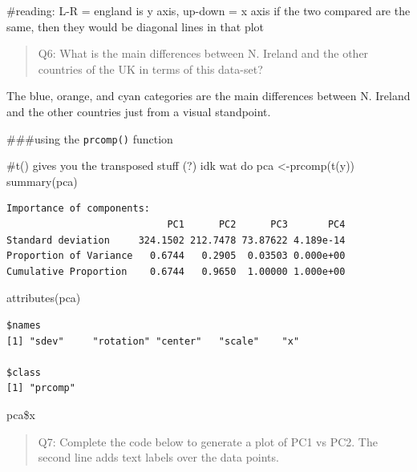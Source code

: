 \documentclass[
  letterpaper,
  DIV=11,
  numbers=noendperiod]{scrartcl}
\newenvironment{Shaded}{\begin{snugshade}}{\end{snugshade}}
\newcommand{\CommentTok}[1]{\textcolor[rgb]{0.37,0.37,0.37}{#1}}
\newcommand{\FunctionTok}[1]{\textcolor[rgb]{0.28,0.35,0.67}{#1}}
\newcommand{\NormalTok}[1]{\textcolor[rgb]{0.00,0.23,0.31}{#1}}
\newcommand{\OtherTok}[1]{\textcolor[rgb]{0.00,0.23,0.31}{#1}}
\begin{document}
\begin{Shaded}
\begin{Highlighting}[]
\CommentTok{\#reading: L{-}R = england is y axis, up{-}down = x axis if the two compared are the same, then they would be diagonal lines in that plot}
\end{Highlighting}
\end{Shaded}

\begin{quote}
Q6: What is the main differences between N. Ireland and the other
countries of the UK in terms of this data-set?
\end{quote}

The blue, orange, and cyan categories are the main differences between
N. Ireland and the other countries just from a visual standpoint.

\#\#\#using the \texttt{prcomp()} function

\begin{Shaded}
\begin{Highlighting}[]
\CommentTok{\#\textasciigrave{}t()\textasciigrave{} gives you the transposed stuff (?) idk wat do}
\NormalTok{pca }\OtherTok{\textless{}{-}}\FunctionTok{prcomp}\NormalTok{(}\FunctionTok{t}\NormalTok{(y))}
\FunctionTok{summary}\NormalTok{(pca)}
\end{Highlighting}
\end{Shaded}

\begin{verbatim}
Importance of components:
                            PC1      PC2      PC3       PC4
Standard deviation     324.1502 212.7478 73.87622 4.189e-14
Proportion of Variance   0.6744   0.2905  0.03503 0.000e+00
Cumulative Proportion    0.6744   0.9650  1.00000 1.000e+00
\end{verbatim}

\begin{Shaded}
\begin{Highlighting}[]
\FunctionTok{attributes}\NormalTok{(pca)}
\end{Highlighting}
\end{Shaded}

\begin{verbatim}
$names
[1] "sdev"     "rotation" "center"   "scale"    "x"       

$class
[1] "prcomp"
\end{verbatim}

pca\$x

\begin{quote}
Q7: Complete the code below to generate a plot of PC1 vs PC2. The second
line adds text labels over the data points.
\end{quote}
\end{document}
